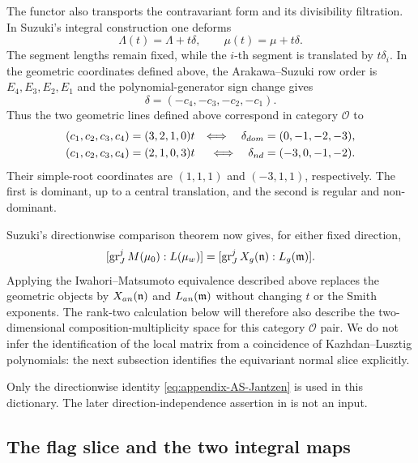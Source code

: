 \documentclass[10pt,a4paper]{amsart}
\begin{document}
The functor also transports the contravariant form and its divisibility
filtration.  In Suzuki's integral construction one deforms
\[
 \Lambda(t)=\Lambda+t\delta,
 \qquad
 \mu(t)=\mu+t\delta.
\]
The segment lengths remain fixed, while the $i$-th segment is translated by
$t\delta_i$.  In the geometric coordinates defined above, the
Arakawa--Suzuki row order is $E_4,E_3,E_2,E_1$ and the polynomial-generator
sign change gives
\begin{equation}\label{eq:appendix-AS-direction-dictionary}
 \delta=(-c_4,-c_3,-c_2,-c_1).
\end{equation}
Thus the two geometric lines defined above correspond in category
$\mathcal O$ to
\begin{align*}
 (c_1,c_2,c_3,c_4)&=(3,2,1,0)t
 &\Longleftrightarrow\quad
 \delta_{\rm dom}&=(0,-1,-2,-3),\\
 (c_1,c_2,c_3,c_4)&=(2,1,0,3)t
 &\Longleftrightarrow\quad
 \delta_{\rm nd}&=(-3,0,-1,-2).
\end{align*}
Their simple-root coordinates are $(1,1,1)$ and $(-3,1,1)$,
respectively.  The first is dominant, up to a central translation, and the
second is regular and non-dominant.

Suzuki's directionwise comparison theorem
\cite[Theorem~4.3.5]{Suzuki} now gives, for either fixed direction,
\begin{equation}\label{eq:appendix-AS-Jantzen}
 [\operatorname{gr}_J^jM(\mu_0):L(\mu_w)]
 =
 [\operatorname{gr}_J^jX_{\rm g}(\mathfrak n):
    L_{\rm g}(\mathfrak m)].
\end{equation}
Applying the Iwahori--Matsumoto equivalence described above replaces the
geometric objects by $X_{\rm an}(\mathfrak n)$ and
$L_{\rm an}(\mathfrak m)$ without changing $t$ or the Smith exponents.
The rank-two calculation below will therefore also describe the
two-dimensional composition-multiplicity space for this category
$\mathcal O$ pair.  We do not infer the identification of the local
matrix from a coincidence of Kazhdan--Lusztig polynomials: the next
subsection identifies the equivariant normal slice explicitly.

Only the directionwise identity \eqref{eq:appendix-AS-Jantzen} is used
in this dictionary.  The later direction-independence assertion in
\cite[Proposition~5.3.2]{Suzuki} is not an input.

\subsection{The flag slice and the two integral maps}
\end{document}

